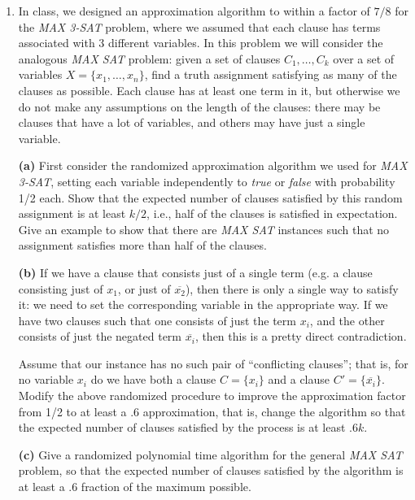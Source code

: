 \documentclass[12pt]{article}
\begin{document}
\begin{enumerate}
{}


\item 

In class, we designed an approximation algorithm to within
a factor of $7/8$ for the {\em MAX 3-SAT} problem,
where we assumed  that each clause has terms
associated with 3 different variables.
In this problem we will consider the analogous {\em MAX SAT} problem:
given a set of clauses $C_1,\ldots, C_k$  over a set of variables
$X=\{x_1,\ldots, x_n\}$, find a truth assignment satisfying as many of
the clauses as possible. Each clause has at least one term in it,
but otherwise we do not make any assumptions on the length of
the clauses: there may be clauses that have a lot of variables, and
others may have just a single variable.

\medskip
{\bf (a)} First consider the randomized approximation algorithm we used for
{\em MAX 3-SAT}, setting each variable independently to {\em true} or
{\em false} with probability 1/2 each. Show that the expected number
of clauses satisfied by this random assignment is at least $k/2$, i.e.,
half of the clauses is satisfied in expectation. Give an example to show
that there are {\em MAX SAT} instances such that no assignment satisfies more
than half of the clauses.

\medskip
{\bf (b)} If we have a clause that consists just of a single
term (e.g. a clause consisting just of $x_1$, or just of $\overline{x_2}$),
then there is only a single way to satisfy it:
we need to set the corresponding variable in the appropriate way.
If we have two clauses such that one consists of just
the term $x_i$, and the other consists of just the negated term
$\overline{x_i}$, then this is a pretty direct contradiction.

Assume that our instance has no such pair of ``conflicting clauses'';
that is, for no variable $x_i$
do we have both a clause $C=\{x_i\}$ and a clause $C'=\{\overline{x_i}\}$.
Modify the above randomized procedure to improve the approximation factor
from 1/2 to at least a .6 approximation, that is, change the algorithm so
that the expected number of clauses satisfied by the process is at least $.6k$.

\medskip
{\bf (c)} Give a randomized polynomial time algorithm for the general
{\em MAX SAT} problem, so that the expected number of clauses satisfied
by the algorithm is at least a .6 fraction of the maximum possible.


\end{enumerate}
\end{document}
